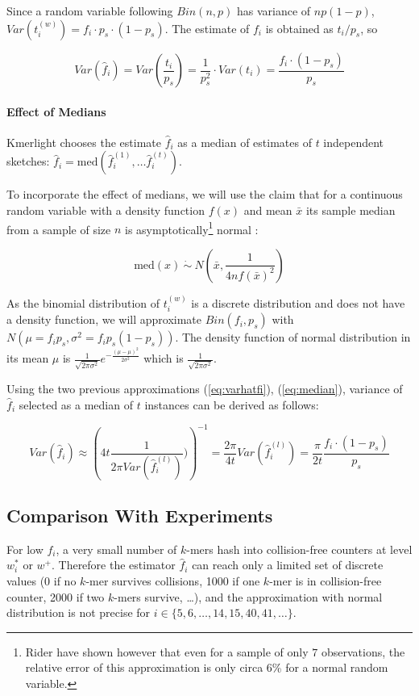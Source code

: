Since a random variable following $Bin(n, p)$ has variance of $np(1-p)$, 
$Var(t_i^{(w)}) = f_i \cdot p_s \cdot (1-p_s)$. The estimate of $f_i$ is obtained
as $t_i / p_s$, so

\begin{equation} \label{eq:varhatfi}
Var(\hat f_i) = Var \left( \frac{t_i}{p_s} \right) = \frac{1}{p_s^2}
\cdot Var(t_i) = \frac{f_i \cdot (1 - p_s)}{p_s}
\end{equation}

\paragraph{Effect of Medians}
Kmerlight chooses the estimate $\hat f_i$ as a median of estimates of $t$ 
independent sketches: $\hat f_i = \mathrm{med}(\hat f_i^{(1)}, \dots \hat f_i^{(t)})$.

To incorporate the effect of medians, we will use the claim that for a continuous random
variable with a density function $f(x)$ and mean $\bar x$ its sample median from a sample of
size $n$ is asymptotically\footnote{Rider \cite{Rider1960} have shown however that 
even for a sample of only $7$ observations, the relative error of this approximation is only
circa 6\% for a normal random variable.} normal \cite{WikiMedian}:

\begin{equation} \label{eq:median}
\mathrm{med}(x) ~\dot\sim~ N\left(\bar x, \frac{1}{4nf(\bar x)^2}\right)
\end{equation}

As the binomial distribution of $t_i^{(w)}$ is a discrete distribution and does
not have a density function, we will approximate $Bin(f_i, p_s)$ with
$N(\mu = f_i p_s, \sigma^2 = f_i p_s(1-p_s))$. The density function of normal distribution
in its mean $\mu$ is $\frac{1}{\sqrt{2\pi\sigma^2}} e^{-\frac{(\mu - \mu)^2}{2\sigma^2}}$
which is $\frac{1}{\sqrt{2\pi\sigma^2}}$.

Using the two previous approximations (\ref{eq:varhatfi}), (\ref{eq:median}), 
variance of $\hat f_i$ selected as a median of $t$ instances can be derived as follows:

\begin{equation} \label{eq:variance}
Var(\hat f_i) \approx \left( 4t\frac{1}{2\pi Var(\hat f_i^{(l)})}) \right)^{-1} =
\frac{2\pi}{4t} Var(\hat f_i^{(l)}) = \frac{\pi}{2t} \frac{f_i \cdot (1 - p_s)}{p_s}
\end{equation}


\subsection{Comparison With Experiments}
For low $f_i$, a very small number of $k$-mers hash into collision-free counters at level $w_i^*$
or $w^+$. Therefore the estimator $\hat f_i$ can reach only a limited set of discrete values (0 if no $k$-mer
survives collisions, 1000 if one $k$-mer is in collision-free counter, 2000 if two $k$-mers survive, \dots),
and the approximation with normal distribution is not precise for $i \in \{ 5, 6, \dots, 14, 15, 40, 41, \dots\}$.

